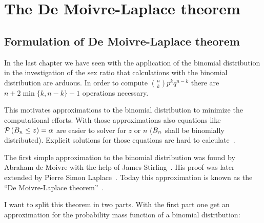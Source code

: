 \chapter{The De Moivre-Laplace theorem}

\section{Formulation of De Moivre-Laplace theorem}



In the last chapter we have seen with the application of the binomial distribution in the investigation of the sex ratio that calculations with the binomial distribution are arduous. In order to compute $\binom nk p^kq^{n-k}$ there are $n+2\min\{k,n-k\}-1$ operations necessary.

This motivates approximations to the binomial distribution to minimize the computational efforts. With those approximations also equations like $\mathcal P\left({B_{n} \le z}\right)=\alpha$ are easier to solver for $z$ or $n$ ($B_{n}$ shall be binomially distributed). Explicit solutions for those equations are hard to calculate~\cite[p. 469]{hald1}.

The first simple approximation to the binomial distribution was found by Abraham de Moivre with the help of James Stirling~\cite[p. 469]{hald1}. His proof was later extended by Pierre Simon Laplace~\cite[pp. 495 ff.]{hald1}. Today this approximation is known as the ``De Moivre-Laplace theorem''~\cite[pp. 64-67]{irle}. 

I want to split this theorem in two parts. With the first part one get an approximation for the probability mass function of a binomial distribution:


